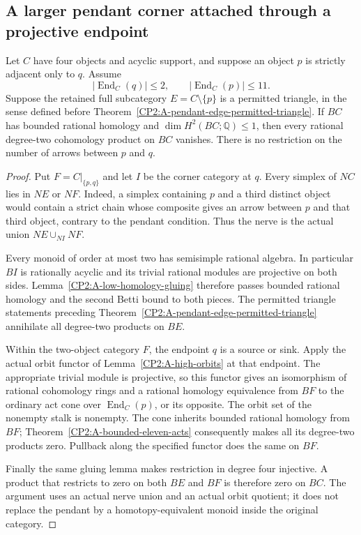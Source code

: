 \subsection{A larger pendant corner attached through a projective endpoint}

\begin{proposition}[Proved]
\label{CP2:A-pendant-eleven-permitted-triangle}
Let $C$ have four objects and acyclic support, and suppose
an object $p$ is strictly adjacent only to $q$.
Assume
\[
 |\operatorname{End}_C(q)|\leq2,
 \qquad |\operatorname{End}_C(p)|\leq11.
\]
Suppose the retained full subcategory $E=C\setminus\{p\}$
is a permitted triangle, in the sense defined before
Theorem~\ref{CP2:A-pendant-edge-permitted-triangle}.
If $BC$ has bounded rational homology and
$\dim H^2(BC;\mathbb Q)\leq1$, then every rational
degree-two cohomology product on $BC$ vanishes.
There is no restriction on the number of arrows between
$p$ and $q$.
\end{proposition}
\begin{proof}
Put $F=C|_{\{p,q\}}$ and let $I$ be the corner category
at $q$. Every simplex of $NC$ lies in $NE$ or $NF$.
Indeed, a simplex containing $p$ and a third distinct
object would contain a strict chain whose composite
gives an arrow between $p$ and that third object,
contrary to the pendant condition. Thus the nerve is
the actual union $NE\cup_{NI}NF$.

Every monoid of order at most two has semisimple
rational algebra. In particular $BI$ is rationally
acyclic and its trivial rational modules are projective
on both sides. Lemma~\ref{CP2:A-low-homology-gluing}
therefore passes bounded rational homology and the
second Betti bound to both pieces. The permitted
triangle statements preceding
Theorem~\ref{CP2:A-pendant-edge-permitted-triangle}
annihilate all degree-two products on $BE$.

Within the two-object category $F$, the endpoint $q$
is a source or sink. Apply the actual orbit functor of
Lemma~\ref{CP2:A-high-orbits} at that endpoint.
The appropriate trivial module is projective, so this
functor gives an isomorphism of rational cohomology
rings and a rational homology equivalence from $BF$
to the ordinary act cone over
$\operatorname{End}_C(p)$, or its opposite.
The orbit set of the nonempty stalk is nonempty.
The cone inherits bounded rational homology from $BF$;
Theorem~\ref{CP2:A-bounded-eleven-acts} consequently
makes all its degree-two products zero. Pullback along
the specified functor does the same on $BF$.

Finally the same gluing lemma makes restriction in
degree four injective. A product that restricts to zero
on both $BE$ and $BF$ is therefore zero on $BC$.
The argument uses an actual nerve union and an actual
orbit quotient; it does not replace the pendant by a
homotopy-equivalent monoid inside the original category.
\end{proof}

